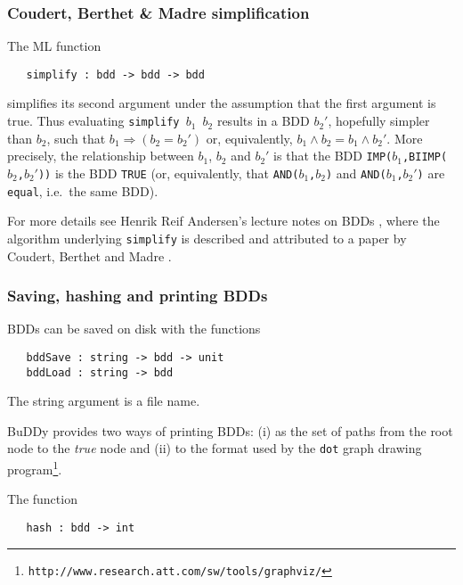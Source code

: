 \documentclass[12pt]{book}
\renewcommand{\t}[1]{\mbox{\tt #1}}
\newcommand{\Buddy}{BuDDy{}}
\begin{document}
\subsubsection{Coudert, Berthet \& Madre simplification}

The ML function

\begin{verbatim}
   simplify : bdd -> bdd -> bdd
\end{verbatim}

simplifies its second argument under the assumption that the first
argument is true. Thus evaluating
\t{simplify~$b_1$~$b_2$} results in a BDD $b_2'$, hopefully simpler than $b_2$, such that
$b_1 \Rightarrow (b_2 = b_2')$ or, equivalently, \mbox{$b_1 \wedge b_2 = b_1 \wedge b_2'$}.
More precisely,
the relationship between $b_1$, $b_2$ and $b_2'$ is that
the BDD \t{IMP($b_1$,BIIMP($b_2$,$b_2'$))} is the BDD \t{TRUE}
(or, equivalently, that \t{AND($b_1$,$b_2$)} and \t{AND($b_1$,$b_2'$)}
are \t{equal}, i.e.~the same BDD).

For more details see Henrik Reif Andersen's lecture
notes on BDDs \cite{HenrikNotes}, where
the algorithm underlying \t{simplify} is described and attributed to a paper by
Coudert, Berthet and Madre \cite{CoudertBerthetMadre}.

\subsubsection{Saving, hashing and printing BDDs}\label{printing}

BDDs can be saved on disk with the functions

\begin{verbatim}
   bddSave : string -> bdd -> unit
   bddLoad : string -> bdd
\end{verbatim}

The string argument is a file name.

\Buddy{} provides two ways of printing BDDs: (i) as the set of paths from
the root node to the {\it{true}} node and (ii) to the format used by
the \t{dot} graph drawing
program\footnote{\texttt{http://www.research.att.com/sw/tools/graphviz/}}.

The function

\begin{verbatim}
   hash : bdd -> int
\end{verbatim}
\end{document}
